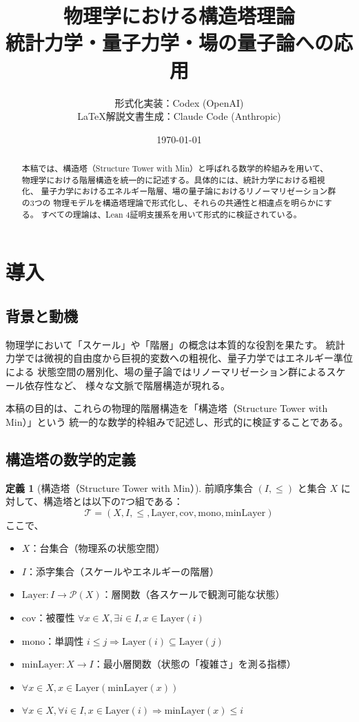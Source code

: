 \documentclass[a4paper,12pt]{ltjsarticle}
\title{物理学における構造塔理論\\
\large 統計力学・量子力学・場の量子論への応用}
\author{%
  形式化実装：Codex (OpenAI)\\
  \LaTeX{}解説文書生成：Claude Code (Anthropic)%
}
\date{\today}
\theoremstyle{definition}
\newtheorem{definition}[theorem]{定義}
\newcommand{\Layer}{\mathrm{Layer}}
\newcommand{\minLayer}{\mathrm{minLayer}}
\begin{document}
\maketitle

\begin{abstract}
本稿では、構造塔（Structure Tower with Min）と呼ばれる数学的枠組みを用いて、
物理学における階層構造を統一的に記述する。具体的には、統計力学における粗視化、
量子力学におけるエネルギー階層、場の量子論におけるリノーマリゼーション群の3つの
物理モデルを構造塔理論で形式化し、それらの共通性と相違点を明らかにする。
すべての理論は、Lean 4証明支援系を用いて形式的に検証されている。
\end{abstract}

\tableofcontents

\section{導入}

\subsection{背景と動機}

物理学において「スケール」や「階層」の概念は本質的な役割を果たす。
統計力学では微視的自由度から巨視的変数への粗視化、量子力学ではエネルギー準位による
状態空間の層別化、場の量子論ではリノーマリゼーション群によるスケール依存性など、
様々な文脈で階層構造が現れる。

本稿の目的は、これらの物理的階層構造を「構造塔（Structure Tower with Min）」という
統一的な数学的枠組みで記述し、形式的に検証することである。

\subsection{構造塔の数学的定義}

\begin{definition}[構造塔（Structure Tower with Min）]
前順序集合 $(I, \leq)$ と集合 $X$ に対して、構造塔とは以下の7つ組である：
\[
\mathcal{T} = (X, I, \leq, \Layer, \mathrm{cov}, \mathrm{mono}, \minLayer)
\]
ここで、
\begin{itemize}
  \item $X$：台集合（物理系の状態空間）
  \item $I$：添字集合（スケールやエネルギーの階層）
  \item $\Layer : I \to \mathcal{P}(X)$：層関数（各スケールで観測可能な状態）
  \item $\mathrm{cov}$：被覆性 $\forall x \in X, \exists i \in I, x \in \Layer(i)$
  \item $\mathrm{mono}$：単調性 $i \leq j \Rightarrow \Layer(i) \subseteq \Layer(j)$
  \item $\minLayer : X \to I$：最小層関数（状態の「複雑さ」を測る指標）
  \item $\forall x \in X, x \in \Layer(\minLayer(x))$
  \item $\forall x \in X, \forall i \in I, x \in \Layer(i) \Rightarrow \minLayer(x) \leq i$
\end{itemize}
\end{definition}
\end{document}
